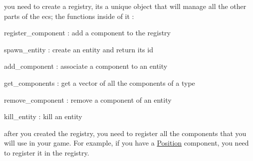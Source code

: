 \begin{DoxyEnumerate}
\item you need to create a registry, its a unique object that will manage all the other parts of the ecs; the functions inside of it \+:
\begin{DoxyItemize}
\item register\+\_\+component \+: add a component to the registry
\item spawn\+\_\+entity \+: create an entity and return its id
\item add\+\_\+component \+: associate a component to an entity
\item get\+\_\+components \+: get a vector of all the components of a type
\item remove\+\_\+component \+: remove a component of an entity
\item kill\+\_\+entity \+: kill an entity
\end{DoxyItemize}
\end{DoxyEnumerate}


\begin{DoxyCode}{0}
\DoxyCodeLine{\}}

\end{DoxyCode}



\begin{DoxyEnumerate}
\item after you created the registry, you need to register all the components that you will use in your game. For example, if you have a \mbox{\hyperlink{structPosition}{Position}} component, you need to register it in the registry.
\end{DoxyEnumerate}


\begin{DoxyCode}{0}
\DoxyCodeLine{\}}

\end{DoxyCode}



